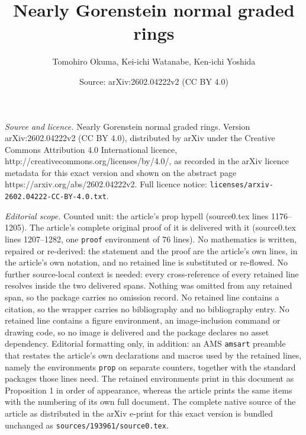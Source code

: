 \documentclass[10pt,a4paper]{amsart}
\title{Nearly Gorenstein normal graded rings}
\author{Tomohiro Okuma, Kei-ichi Watanabe, Ken-ichi Yoshida}
\date{Source: arXiv:2602.04222v2 (CC BY 4.0)}
\begin{document}
\maketitle

\noindent\emph{Source and licence.} Nearly Gorenstein normal graded rings. Version arXiv:2602.04222v2 (CC BY 4.0), distributed by arXiv under the Creative Commons Attribution 4.0 International licence, http://creativecommons.org/licenses/by/4.0/, as recorded in the arXiv licence metadata for this exact version and shown on the abstract page https://arxiv.org/abs/2602.04222v2. Full licence notice: \texttt{licenses/arxiv-2602.04222-CC-BY-4.0.txt}.\par\smallskip

\noindent\textit{Editorial scope.} Counted unit: the article's prop hypell (source0.tex lines 1176--1205). The article's complete original proof of it is delivered with it (source0.tex lines 1207--1282, one \texttt{proof} environment of 76 lines). No mathematics is written, repaired or re-derived: the statement and the proof are the article's own lines, in the article's own notation, and no retained line is substituted or re-flowed.  No further source-local context is needed: every cross-reference of every retained line resolves inside the two delivered spans.  Nothing was omitted from any retained span, so the package carries no omission record.  No retained line contains a citation, so the wrapper carries no bibliography and no bibliography entry.  No retained line contains a figure environment, an image-inclusion command or drawing code, so no image is delivered and the package declares no asset dependency.  Editorial formatting only, in addition: an AMS \texttt{amsart} preamble that restates the article's own declarations and macros used by the retained lines, namely the environments \texttt{prop} on separate counters, together with the standard packages those lines need.  The retained environments print in this document as Proposition 1 in order of appearance, whereas the article prints the same items with the numbering of its own full document.  The complete native source of the article as distributed in the arXiv e-print for this exact version is bundled unchanged as \texttt{sources/193961/source0.tex}.
\end{document}
